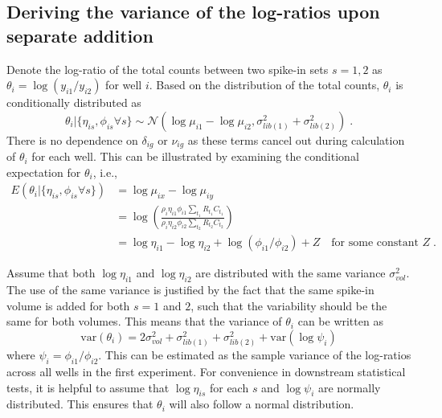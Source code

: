 \documentclass{article}
\begin{document}
\subsection{Deriving the variance of the log-ratios upon separate addition}
Denote the log-ratio of the total counts between two spike-in sets $s=1, 2$ as $\theta_i = \log(y_{i1}/y_{i2})$ for well $i$.
Based on the distribution of the total counts, $\theta_i$ is conditionally distributed as
\[
    \theta_i |  \{ \eta_{is}, \phi_{is} \forall s \} \sim \mathcal{N}( \log \mu_{i1} - \log \mu_{i2}, \sigma^2_{lib(1)} + \sigma^2_{lib(2)} ) \;. 
\]
There is no dependence on $\delta_{ig}$ or $\nu_{ig}$ as these terms cancel out during calculation of $\theta_i$ for each well.
This can be illustrated by examining the conditional expectation for $\theta_i$, i.e.,
\begin{align*}
    E(\theta_i |  \{ \eta_{is}, \phi_{is} \forall s \})
    &= \log \mu_{ix} - \log \mu_{iy} \\
    &= \log \left( \frac{\rho_i \eta_{i1} \phi_{i1} \sum_{t_1} R_{t_1} C_{t_1}}{\rho_i \eta_{i2} \phi_{i2} \sum_{t_2} R_{t_2} C_{t_2}} \right) \\
    &= \log \eta_{i1} - \log \eta_{i2} +  \log (\phi_{i1} / \phi_{i2})  + Z \quad\mbox{for some constant } Z \;.
\end{align*}

Assume that both $\log \eta_{i1}$ and $\log \eta_{i2}$ are distributed with the same variance $\sigma^2_{vol}$.
The use of the same variance is justified by the fact that the same spike-in volume is added for both $s=1$ and $2$, such that the variability should be the same for both volumes.
This means that the variance of $\theta_i$ can be written as
\[
\mbox{var}(\theta_i) = 2\sigma_{vol}^2 + \sigma^2_{lib(1)} + \sigma^2_{lib(2)} + \mbox{var}(\log \psi_i)
\]
where $\psi_i = \phi_{i1}/\phi_{i2}$.
This can be estimated as the sample variance of the log-ratios across all wells in the first experiment. 
For convenience in downstream statistical tests, it is helpful to assume that $\log \eta_{is}$ for each $s$ and $\log \psi_i$ are normally distributed.
This ensures that $\theta_i$ will also follow a normal distribution.
\end{document}
